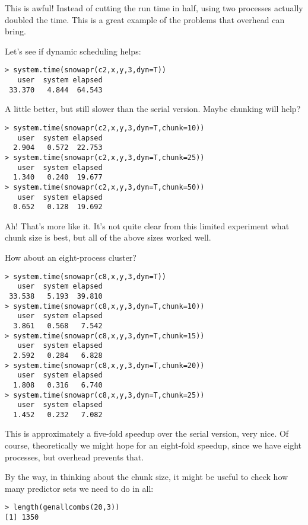 This is awful!  Instead of cutting the run time in half, using two
processes actually doubled the time.  This is a great example of the
problems that overhead can bring.

Let's see if dynamic scheduling helps:

\begin{Verbatim}[fontsize=\relsize{-1}]
> system.time(snowapr(c2,x,y,3,dyn=T))
   user  system elapsed
 33.370   4.844  64.543
\end{Verbatim}

A little better, but still slower than the serial version.
Maybe chunking will help?

\begin{Verbatim}[fontsize=\relsize{-1}]
> system.time(snowapr(c2,x,y,3,dyn=T,chunk=10))
   user  system elapsed
  2.904   0.572  22.753
> system.time(snowapr(c2,x,y,3,dyn=T,chunk=25))
   user  system elapsed
  1.340   0.240  19.677
> system.time(snowapr(c2,x,y,3,dyn=T,chunk=50))
   user  system elapsed
  0.652   0.128  19.692
\end{Verbatim}

Ah!  That's more like it.  It's not quite clear from this limited
experiment what chunk size is best, but all of the above sizes worked
well.

How about an eight-process cluster?

\begin{Verbatim}[fontsize=\relsize{-1}]
> system.time(snowapr(c8,x,y,3,dyn=T))
   user  system elapsed
 33.538   5.193  39.810
> system.time(snowapr(c8,x,y,3,dyn=T,chunk=10))
   user  system elapsed
  3.861   0.568   7.542
> system.time(snowapr(c8,x,y,3,dyn=T,chunk=15))
   user  system elapsed
  2.592   0.284   6.828
> system.time(snowapr(c8,x,y,3,dyn=T,chunk=20))
   user  system elapsed
  1.808   0.316   6.740
> system.time(snowapr(c8,x,y,3,dyn=T,chunk=25))
   user  system elapsed
  1.452   0.232   7.082
\end{Verbatim}

This is approximately a five-fold speedup over the serial version, very
nice.  Of course, theoretically we might hope for an eight-fold speedup,
since we have eight processes, but overhead prevents that.

By the way, in thinking about the chunk size, it might be useful to
check how many predictor sets we need to do in all:

\begin{Verbatim}[fontsize=\relsize{-1}]
> length(genallcombs(20,3))
[1] 1350
\end{Verbatim}

